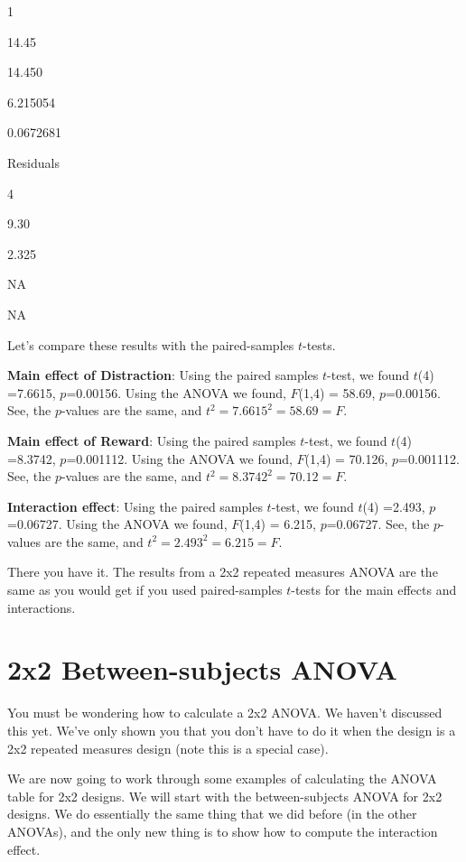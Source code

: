 \documentclass[
]{book}
\begin{document}
1

14.45

14.450

6.215054

0.0672681

Residuals

4

9.30

2.325

NA

NA

Let's compare these results with the paired-samples \(t\)-tests.

\textbf{Main effect of Distraction}: Using the paired samples \(t\)-test, we found \(t\)(4) =7.6615, \(p\)=0.00156. Using the ANOVA we found, \(F\)(1,4) = 58.69, \(p\)=0.00156. See, the \(p\)-values are the same, and \(t^2 = 7.6615^2 = 58.69 = F\).

\textbf{Main effect of Reward}: Using the paired samples \(t\)-test, we found \(t\)(4) =8.3742, \(p\)=0.001112. Using the ANOVA we found, \(F\)(1,4) = 70.126, \(p\)=0.001112. See, the \(p\)-values are the same, and \(t^2 = 8.3742^2 = 70.12 = F\).

\textbf{Interaction effect}: Using the paired samples \(t\)-test, we found \(t\)(4) =2.493, \(p\)=0.06727. Using the ANOVA we found, \(F\)(1,4) = 6.215, \(p\)=0.06727. See, the \(p\)-values are the same, and \(t^2 = 2.493^2 = 6.215 = F\).

There you have it. The results from a 2x2 repeated measures ANOVA are the same as you would get if you used paired-samples \(t\)-tests for the main effects and interactions.

\hypertarget{x2-between-subjects-anova}{%
\section{2x2 Between-subjects ANOVA}\label{x2-between-subjects-anova}}

You must be wondering how to calculate a 2x2 ANOVA. We haven't discussed this yet. We've only shown you that you don't have to do it when the design is a 2x2 repeated measures design (note this is a special case).

We are now going to work through some examples of calculating the ANOVA table for 2x2 designs. We will start with the between-subjects ANOVA for 2x2 designs. We do essentially the same thing that we did before (in the other ANOVAs), and the only new thing is to show how to compute the interaction effect.
\end{document}
